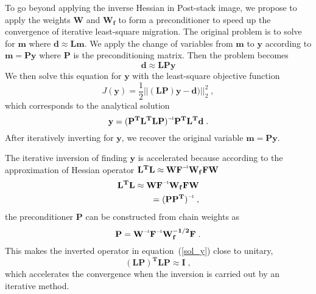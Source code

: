 To go beyond applying the inverse Hessian in Post-stack image, we propose to apply the weights $\mathbf{W}$ and $\mathbf{W_{f}}$ to form a preconditioner to speed up the convergence of iterative least-square migration. The original problem is to solve for $\mathbf{m}$ where $\mathbf{d \approx Lm}$. We apply the change of variables from $\mathbf{m}$ to $\mathbf{y}$ according to $\mathbf{m} = \mathbf{Py}$ where $\mathbf{P}$ is the preconditioning matrix. Then the problem becomes
\begin{equation}
    \mathbf{d} \approx \mathbf{LPy}
\end{equation}
We then solve this equation for $\mathbf{y}$ with the least-square objective function 
\begin{equation}
     J(\mathbf{y}) = \frac{1}{2} || \mathbf{(LP)y - d) }||_2 ^2\;,
\end{equation}
which corresponds to the analytical solution
\begin{equation}
    \mathbf{y = \inv{(P^{T}L^{T}LP)}P^{T}L^{T}d}\;.
\label{sol_y}
\end{equation}
After iteratively inverting for $\mathbf{y}$, we recover the original variable $\mathbf{m = Py}$.

The iterative inversion of finding $\mathbf{y}$ is accelerated because according to the approximation of Hessian operator $\mathbf{L^{T}L \approx W\inv{F}W_{f}FW}$
\begin{equation} \label{precondition}
\begin{split}
    \mathbf{L^{T}L \approx W\inv{F}W_{f}FW} \\
            \mathbf{=  \inv{(PP^{T})}}\;,
\end{split}
\end{equation}
the preconditioner $\mathbf{P}$ can be constructed from chain weights as
\begin{equation}
    \mathbf{P = \inv{W}\inv{F}W_{f}^{-1/2}F}\;.
\label{prec}
\end{equation}
This makes the inverted operator in equation~(\ref{sol_y}) close to unitary,
\begin{equation}
    \mathbf{(LP)^{T}LP \approx I}\;,
\end{equation}
which accelerates the convergence when the inversion is carried out by an iterative method.  
